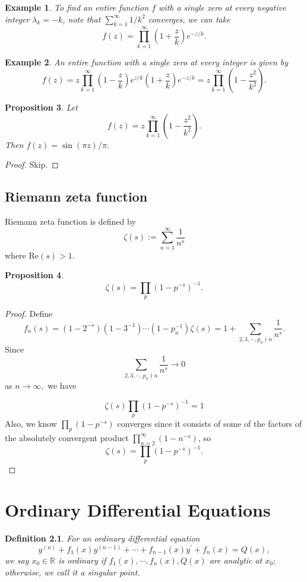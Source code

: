 \documentclass{book}
\newtheorem{defi}{Definition}[section]
\newtheorem{prop}[defi]{Proposition}
\newtheorem{eg}[defi]{Example}
\numberwithin{equation}{section}
\begin{document}
\begin{eg}
To find an entire function $f$ with a single zero at every negative integer $\lambda_k=-k$, note that $\sum_{k=1}^\infty 1/k^2$ converges, we can take
$$
f(z)=\prod_{k=1}^\infty (1+\frac{z}{k})e^{-z/k}.
$$
\end{eg}

\begin{eg}
 An entire function with a single zero at every integer is given by
$$
f(z)=z\prod_{k=1}^\infty (1-\frac{z}{k})e^{z/k}(1+\frac{z}{k})e^{-z/k}=z\prod_{k=1}^\infty (1-\frac{z^2}{k^2}).
$$
\end{eg}
\begin{prop}
Let
$$
f(z)=z\prod_{k=1}^\infty (1-\frac{z^2}{k^2}).
$$ Then $f(z)=\sin(\pi z)/\pi.$
\end{prop}
\begin{proof}
Skip.
\end{proof}

\section{Riemann zeta function}
Riemann zeta function is defined by
$$
\zeta(s):=\sum_{n=1}^\infty \frac{1}{n^s}
$$ where $\mathrm{Re}(s)>1.$

\begin{prop}
$$
\zeta(s)=\prod_{p}(1-p^{-s})^{-1}.
$$
\end{prop}
\begin{proof}
Define 
$$
f_n(s)=(1-2^{-s})(1-3^{-1})\cdots (1-p_n^{-1})\zeta(s)=1+\sum_{2,3,\cdots,p_n \nmid n} \frac{1}{n^s}.
$$ Since
$$
\sum_{2,3,\cdots,p_n \nmid n} \frac{1}{n^s} \rightarrow 0
$$ as $n\rightarrow \infty,$ we have

$$
\zeta(s)\prod_p (1-p^{-s})^{-1}=1
$$
Also, we know $\prod_p (1-p^{-s})$ converges since it consists of  some of the factors of the absolutely convergent product $\prod_{n=2}^\infty (1-n^{-s})$, so 
$$
\zeta(s)=\prod_{p}(1-p^{-s})^{-1}.
$$
\end{proof}

\chapter{Ordinary Differential Equations}
\begin{defi}
For an ordinary differential equation
$$
y^{(n)}+f_1(x)y^{(n-1)}+\cdots+f_{n-1}(x)y^{\prime}+f_n(x)=Q(x),
$$ we say $x_0 \in \mathbb{R}$ is ordinary if 
$f_1(x), \cdots, f_n(x), Q(x)$ are analytic at $x_0;$ otherwise, we call it a singular point. 
\end{defi}
\end{document}
